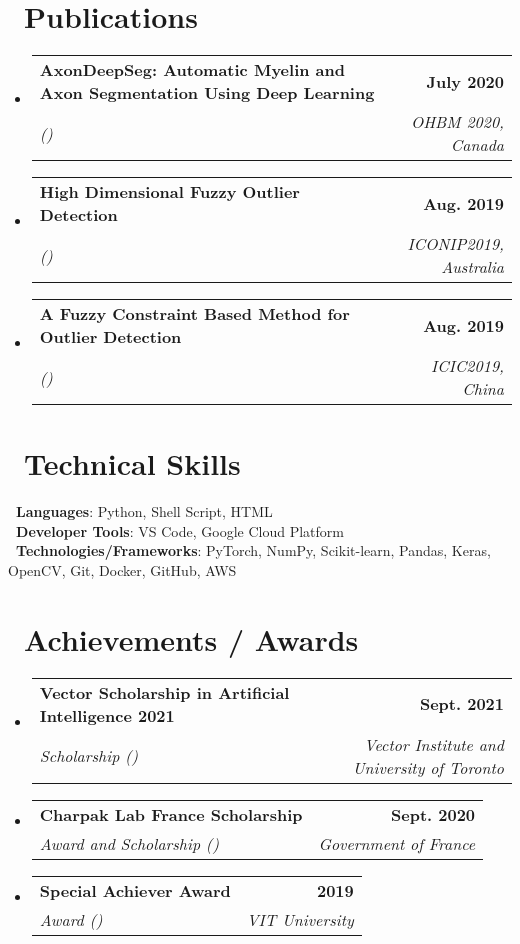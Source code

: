 \documentclass[letterpaper,11pt]{article}
\makeatletter
\newcommand{\resumeSubheading}[4]{
  \vspace{-2pt}\item
    \begin{tabular*}{1.0\textwidth}[t]{l@{\extracolsep{\fill}}r}
      \textbf{#1} & \textbf{\small #2} \\
      \textit{\small#3} & \textit{\small #4} \\
    \end{tabular*}\vspace{-7pt}
}
\newcommand{\resumeSubHeadingListStart}{\begin{itemize}[leftmargin=0.0in, label={}]}
\newcommand{\resumeSubHeadingListEnd}{\end{itemize}}
\makeatother
\begin{document}
\section{\faNewspaper \ Publications}
    \resumeSubHeadingListStart
        \resumeSubheading{AxonDeepSeg: Automatic Myelin and Axon Segmentation Using Deep Learning}{July 2020}{(\href{https://www.humanbrainmapping.org/files/2020/OHBM_2020_Virtual_Abstracts_2.pdf\#page=104}{\faLink})}{OHBM 2020, Canada}
 
        \resumeSubheading{High Dimensional Fuzzy Outlier Detection}{Aug. 2019}{(\href{http://ajiips.com.au/papers/V16.1/v16n1_49-59.pdf}{\faLink})}{ICONIP2019, Australia}


        \resumeSubheading{A Fuzzy Constraint Based Method for Outlier Detection}{Aug. 2019}{(\href{https://link.springer.com/chapter/10.1007/978-3-030-26766-7_47}{\faLink})}{ICIC2019, China}


    \resumeSubHeadingListEnd

\section{\faLaptop \ Technical Skills}
 \begin{itemize}[leftmargin=0.15in, label={}]
    \small{\item{
     \textbf{\faLanguage \ Languages}{: Python, Shell Script, HTML} \\
    \textbf{\faTools \ Developer Tools}{: VS Code, Google Cloud Platform} \\
     \textbf{\faToolbox \ Technologies/Frameworks}{: PyTorch, NumPy, Scikit-learn, Pandas, Keras, OpenCV, Git, Docker, GitHub, AWS} \\
    }}
 \end{itemize}
 \vspace{-16pt}

\section{\faAward \ Achievements / Awards}
    \resumeSubHeadingListStart
        \resumeSubheading{Vector Scholarship in Artificial Intelligence 2021}{Sept. 2021}{Scholarship ({\href{https://vectorinstitute.ai/2021/05/10/newest-vector-ai-scholarship-recipients-join-growing-talent-pool-in-ontario/\#:~:text=Pokhrel\%2C\%20Aslesha-,Sharma\%2C\%20Vasudev,-LeMesurier\%2C\%20Carey}{\faLink}})}{Vector Institute and University of Toronto}
        \resumeSubheading{Charpak Lab France Scholarship}{Sept. 2020}{Award and Scholarship ({\href{https://www.inde.campusfrance.org/result-of-the-charpak-lab-scholarship-programme-2019\#:~:text=12,Toulouse}{\faLink}})}{Government of France}
        \resumeSubheading{Special Achiever Award}{2019}{Award (\href{https://www2.slideshare.net/secret/9CIVAk7yffpwUx}{\faLink})}{VIT University}
    \resumeSubHeadingListEnd
\end{document}
